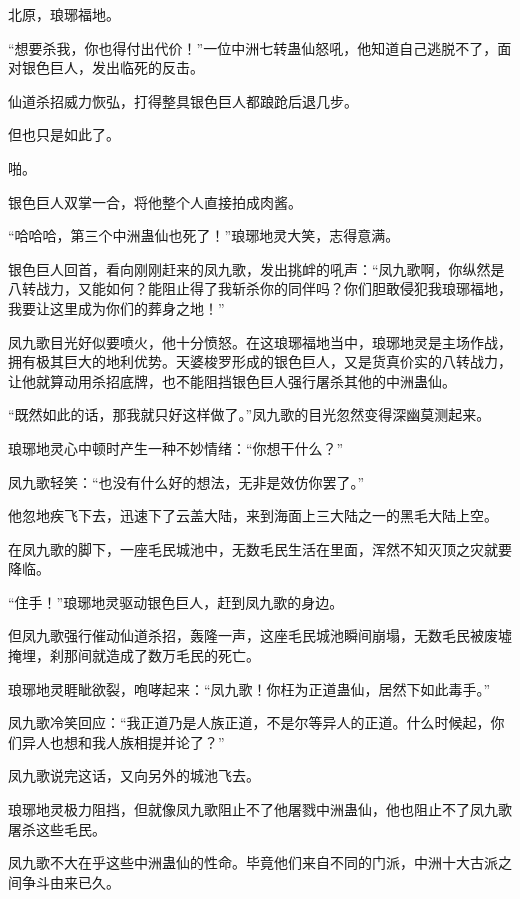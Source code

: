 
\begin{this_body}



北原，琅琊福地。

“想要杀我，你也得付出代价！”一位中洲七转蛊仙怒吼，他知道自己逃脱不了，面对银色巨人，发出临死的反击。

仙道杀招威力恢弘，打得整具银色巨人都踉跄后退几步。

但也只是如此了。

啪。

银色巨人双掌一合，将他整个人直接拍成肉酱。

“哈哈哈，第三个中洲蛊仙也死了！”琅琊地灵大笑，志得意满。

银色巨人回首，看向刚刚赶来的凤九歌，发出挑衅的吼声：“凤九歌啊，你纵然是八转战力，又能如何？能阻止得了我斩杀你的同伴吗？你们胆敢侵犯我琅琊福地，我要让这里成为你们的葬身之地！”

凤九歌目光好似要喷火，他十分愤怒。在这琅琊福地当中，琅琊地灵是主场作战，拥有极其巨大的地利优势。天婆梭罗形成的银色巨人，又是货真价实的八转战力，让他就算动用杀招底牌，也不能阻挡银色巨人强行屠杀其他的中洲蛊仙。

“既然如此的话，那我就只好这样做了。”凤九歌的目光忽然变得深幽莫测起来。

琅琊地灵心中顿时产生一种不妙情绪：“你想干什么？”

凤九歌轻笑：“也没有什么好的想法，无非是效仿你罢了。”

他忽地疾飞下去，迅速下了云盖大陆，来到海面上三大陆之一的黑毛大陆上空。

在凤九歌的脚下，一座毛民城池中，无数毛民生活在里面，浑然不知灭顶之灾就要降临。

“住手！”琅琊地灵驱动银色巨人，赶到凤九歌的身边。

但凤九歌强行催动仙道杀招，轰隆一声，这座毛民城池瞬间崩塌，无数毛民被废墟掩埋，刹那间就造成了数万毛民的死亡。

琅琊地灵睚眦欲裂，咆哮起来：“凤九歌！你枉为正道蛊仙，居然下如此毒手。”

凤九歌冷笑回应：“我正道乃是人族正道，不是尔等异人的正道。什么时候起，你们异人也想和我人族相提并论了？”

凤九歌说完这话，又向另外的城池飞去。

琅琊地灵极力阻挡，但就像凤九歌阻止不了他屠戮中洲蛊仙，他也阻止不了凤九歌屠杀这些毛民。

凤九歌不大在乎这些中洲蛊仙的性命。毕竟他们来自不同的门派，中洲十大古派之间争斗由来已久。


\end{this_body}
